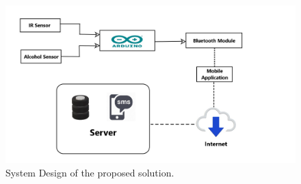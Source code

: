 \documentclass[12pt]{article}
\begin{document}
\begin{figure}[ht]

\centering
\includegraphics[width=\textwidth]{eld_report.jpg}
\caption{System Design of the proposed solution.}

\end{figure}
\end{document}
